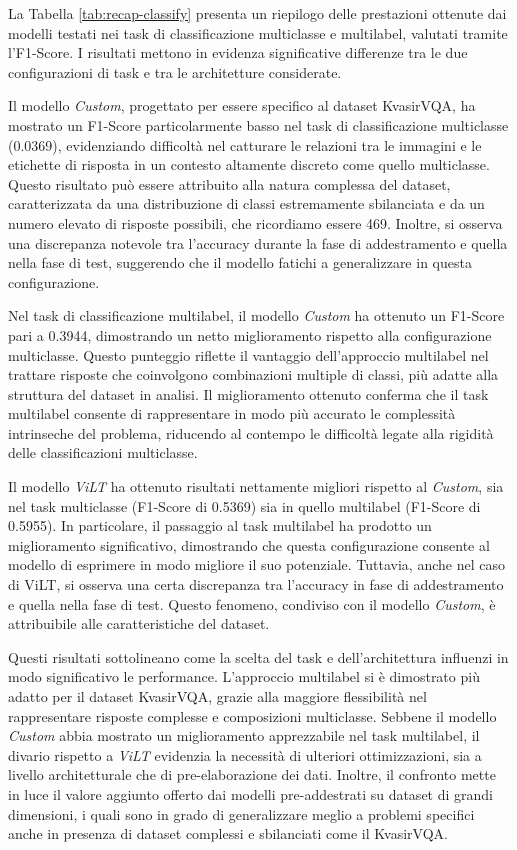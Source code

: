 \documentclass[../main.tex]{subfiles}
\begin{document}
La Tabella \ref{tab:recap-classify} presenta un riepilogo delle prestazioni ottenute dai modelli testati nei task di classificazione multiclasse e multilabel, valutati tramite l'F1-Score. I risultati mettono in evidenza significative differenze tra le due configurazioni di task e tra le architetture considerate.

Il modello \textit{Custom}, progettato per essere specifico al dataset KvasirVQA, ha mostrato un F1-Score particolarmente basso nel task di classificazione multiclasse (0.0369), evidenziando difficoltà nel catturare le relazioni tra le immagini e le etichette di risposta in un contesto altamente discreto come quello multiclasse. Questo risultato può essere attribuito alla natura complessa del dataset, caratterizzata da una distribuzione di classi estremamente sbilanciata e da un numero elevato di risposte possibili, che ricordiamo essere 469. 
Inoltre, si osserva una discrepanza notevole tra l'accuracy durante la fase di addestramento e quella nella fase di test, suggerendo che il modello fatichi a generalizzare in questa configurazione.

Nel task di classificazione multilabel, il modello \textit{Custom} ha ottenuto un F1-Score pari a 0.3944, dimostrando un netto miglioramento rispetto alla configurazione multiclasse. Questo punteggio riflette il vantaggio dell'approccio multilabel nel trattare risposte che coinvolgono combinazioni multiple di classi, più adatte alla struttura del dataset in analisi. Il miglioramento ottenuto conferma che il task multilabel consente di rappresentare in modo più accurato le complessità intrinseche del problema, riducendo al contempo le difficoltà legate alla rigidità delle classificazioni multiclasse.

Il modello \textit{ViLT} ha ottenuto risultati nettamente migliori rispetto al \textit{Custom}, sia nel task multiclasse (F1-Score di 0.5369) sia in quello multilabel (F1-Score di 0.5955). In particolare, il passaggio al task multilabel ha prodotto un miglioramento significativo, dimostrando che questa configurazione consente al modello di esprimere in modo migliore il suo potenziale. 
Tuttavia, anche nel caso di ViLT, si osserva una certa discrepanza tra l'accuracy in fase di addestramento e quella nella fase di test. Questo fenomeno, condiviso con il modello \textit{Custom}, è attribuibile alle caratteristiche del dataset.

Questi risultati sottolineano come la scelta del task e dell'architettura influenzi in modo significativo le performance. L'approccio multilabel si è dimostrato più adatto per il dataset KvasirVQA, grazie alla maggiore flessibilità nel rappresentare risposte complesse e composizioni multiclasse. Sebbene il modello \textit{Custom} abbia mostrato un miglioramento apprezzabile nel task multilabel, il divario rispetto a \textit{ViLT} evidenzia la necessità di ulteriori ottimizzazioni, sia a livello architetturale che di pre-elaborazione dei dati. 
Inoltre, il confronto mette in luce il valore aggiunto offerto dai modelli pre-addestrati su dataset di grandi dimensioni, i quali sono in grado di generalizzare meglio a problemi specifici anche in presenza di dataset complessi e sbilanciati come il KvasirVQA.
\end{document}
